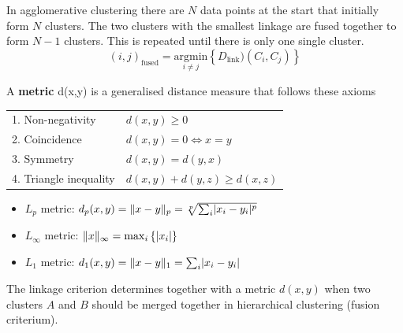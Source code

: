 \documentclass[11pt]{article}
\theoremstyle{definition}
\DeclarePairedDelimiter\abs{\lvert}{\rvert}
\DeclarePairedDelimiter\norm{\lVert}{\rVert}
\begin{document}
In agglomerative clustering there are $N$ data points at the start that initially form $N$ clusters. The two clusters with the smallest linkage are fused together to form $N-1$ clusters. This is repeated until there is only one single cluster.
\begin{equation*}
	(i,j)_{\text{fused}} = \underset{i\neq j}{\text{argmin}} \left\{ D_{\text{link}})(C_i,C_j) \right\}
\end{equation*}

\vspace{1em}
\noindent
A \textbf{metric} d(x,y) is a generalised distance measure that follows these axioms
\begin{tabularx}{\linewidth}{l X}
	1. Non-negativity & $d(x,y)\geq 0$\\
	2. Coincidence & $d(x,y) = 0 \Leftrightarrow x=y$\\
	3. Symmetry & $d(x,y) = d(y,x)$\\
	4. Triangle inequality & $d(x,y) + d(y,z) \geq d(x,z)$
\end{tabularx}
\begin{itemize}
	\item $L_p$ metric: \quad $d_p(x,y) = \norm{x-y}_p = \sqrt[p]{\sum_i \abs{x_i - y_i}^p}$
	\item $L_\infty$ metric: \quad $\norm{x}_\infty = \max_i\left\{\abs{x_i}\right\}$
	\item $L_1$ metric: \quad $d_1(x,y) = \norm{x-y}_1 = \sum_i\abs{x_i - y_i}$
\end{itemize}
\clearpage
The linkage criterion determines together with a metric $d(x,y)$ when two clusters $A$ and $B$ should be merged together in hierarchical clustering (fusion criterium).
\end{document}
